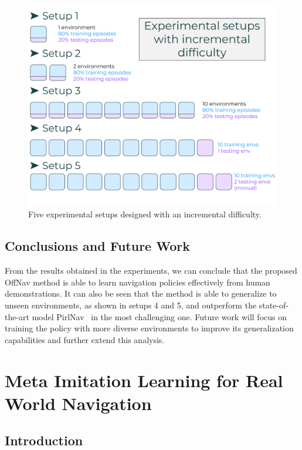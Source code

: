 \begin{figure}
    \centering
    \includegraphics[width=\linewidth]{figures/offnav/experimental_setups}
    \caption{Five experimental setups designed with an incremental difficulty.}
    \label{fig:setups}
\end{figure}

\subsection{Conclusions and Future Work}\label{subsec:conclusions_offnav}

From the results obtained in the experiments, we can conclude that the proposed OffNav method is able to learn navigation policies effectively from human demonstrations.
It can also be seen that the method is able to generalize to unseen environments, as shown in setups 4 and 5, and outperform the state-of-the-art model PirlNav~\cite{ramrakhya2023} in the most challenging one.
Future work will focus on training the policy with more diverse environments to improve its generalization capabilities and further extend this analysis.


\section{Meta Imitation Learning for Real World Navigation}\label{sec:mil-for-real-world-navigation}

\subsection{Introduction}\label{subsec:introduction_metanav}

